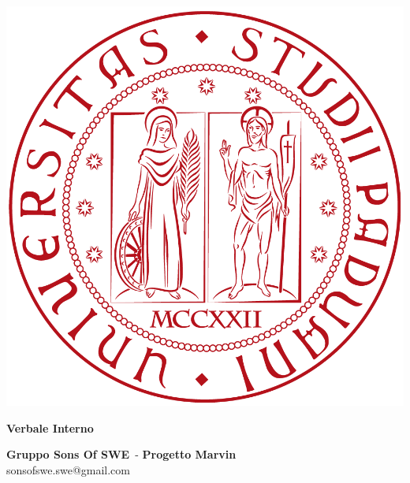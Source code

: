 \documentclass[a4paper, oneside, openany]{article}
\makeatletter
\newcommand{\Titolo}{Verbale Interno}
\newcommand{\Gruppo}{Gruppo Sons Of SWE}
\newcommand{\Data}{3 Marzo 2018}
\newcommand{\NomeProgetto}{Progetto Marvin}
\newcommand{\Mail}{sonsofswe.swe@gmail.com}
\makeatother
\begin{document}
	\begin{titlepage}
		\begin{center}
			
			\begin{center}
				\centerline{\includegraphics[scale=0.24]{../template/img/logo.png}}
			\end{center}
			
			\vspace{1cm}
			
			\begin{Huge}
				\textbf{\Titolo{}} \\
			\end{Huge}
			
			\vspace{9pt}  
			
			\begin{large}
				\textbf{\Gruppo{}}\ - \textbf{\NomeProgetto{}}\\%
				\vspace{6pt}
				\Mail{}
			\end{large}	  
			

\end{center}
\end{titlepage}
\end{document}
